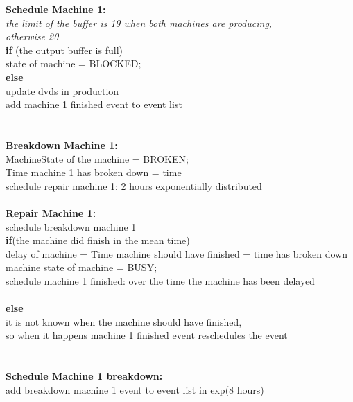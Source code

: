 \documentclass[11pt,a4paper]{article}
\newcommand{\tab}{\hspace*{2em}}
\begin{document}
\noindent \textbf{Schedule Machine 1:} \textbraceleft\\ 
	\tab \emph{the limit of the buffer is 19 when both machines are producing, \\
          \tab otherwise 20} \\
	\tab \textbf{if} (the output buffer is full) \textbraceleft \\
	\tab \tab	state of machine = BLOCKED; \\
	\tab \textbraceright \textbf{else} \textbraceleft \\
	\tab \tab	update dvds in production \\
	\tab \tab 	add machine 1 finished event to event list \\
	\tab \textbraceright \\
\textbraceright \\

\noindent \textbf{Breakdown Machine 1:}\textbraceleft\\  
	\tab MachineState of the machine = BROKEN; \\
	\tab Time machine 1 has broken down = time \\
           \tab schedule repair machine 1: 2 hours exponentially distributed \\
\textbraceright \\

\noindent \textbf{Repair Machine 1: } \textbraceleft\\ 
	\tab schedule breakdown machine 1 \\
	\tab \textbf{if}(the machine did finish in the mean time) \textbraceleft \\
 	\tab \tab delay of machine = Time machine should have finished = time has broken down \\
	\tab \tab machine state of machine = BUSY; \\
	\tab \tab schedule machine 1 finished: over the time the machine has been delayed \\
	\tab \textbraceright \\
	\tab \textbf{else} \textbraceleft \\
	\tab \tab it is not known when the machine should have finished, \\
	\tab \tab so when it happens machine 1 finished event reschedules the event \\
	\tab \textbraceright \\
\textbraceright \\

\noindent \textbf{Schedule Machine 1 breakdown:} \textbraceleft\\ 
	\tab add breakdown machine 1 event to event list in exp(8 hours) \\
\textbraceright \\
\end{document}
